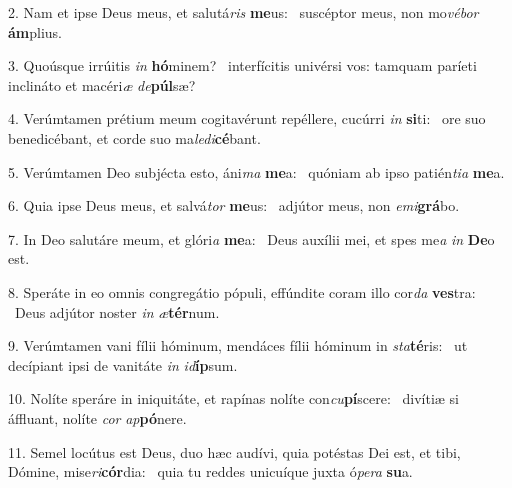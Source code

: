 2. Nam et ipse Deus meus, et salutá\textit{ris} \textbf{me}us: \ast\  suscéptor meus, non mo\textit{vé}\textit{bor} \textbf{ám}plius.\

3. Quoúsque irrúitis \textit{in} \textbf{hó}minem? \ast\  interfícitis univérsi vos: tamquam paríeti inclináto et macéri\textit{æ} \textit{de}\textbf{púl}sæ?\

4. Verúmtamen prétium meum cogitavérunt repéllere, cucúrri \textit{in} \textbf{si}ti: \ast\  ore suo benedicébant, et corde suo ma\textit{le}\textit{di}\textbf{cé}bant.\

5. Verúmtamen Deo subjécta esto, áni\textit{ma} \textbf{me}a: \ast\  quóniam ab ipso patién\textit{ti}\textit{a} \textbf{me}a.\

6. Quia ipse Deus meus, et salvá\textit{tor} \textbf{me}us: \ast\  adjútor meus, non \textit{e}\textit{mi}\textbf{grá}bo.\

7. In Deo salutáre meum, et glóri\textit{a} \textbf{me}a: \ast\  Deus auxílii mei, et spes me\textit{a} \textit{in} \textbf{De}o est.\

8. Speráte in eo omnis congregátio pópuli, effúndite coram illo cor\textit{da} \textbf{ves}tra: \ast\  Deus adjútor noster \textit{in} \textit{æ}\textbf{tér}num.\

9. Verúmtamen vani fílii hóminum, mendáces fílii hóminum in \textit{sta}\textbf{té}ris: \ast\  ut decípiant ipsi de vanitáte \textit{in} \textit{id}\textbf{íp}sum.\

10. Nolíte speráre in iniquitáte, et rapínas nolíte con\textit{cu}\textbf{pí}scere: \ast\  divítiæ si áffluant, nolíte \textit{cor} \textit{ap}\textbf{pó}nere.\

11. Semel locútus est Deus, duo hæc audívi, quia potéstas Dei est, et tibi, Dómine, mise\textit{ri}\textbf{cór}dia: \ast\  quia tu reddes unicuíque juxta ó\textit{pe}\textit{ra} \textbf{su}a.\

